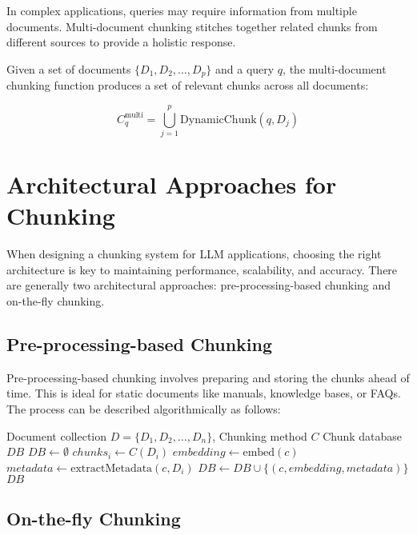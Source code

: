 \documentclass{article}
\begin{document}
In complex applications, queries may require information from multiple documents. Multi-document chunking stitches together related chunks from different sources to provide a holistic response.

Given a set of documents $\{D_1, D_2, \ldots, D_p\}$ and a query $q$, the multi-document chunking function produces a set of relevant chunks across all documents:

\begin{equation}
C_q^{\textrm{multi}} = \bigcup_{j=1}^p \textrm{DynamicChunk}(q, D_j)
\end{equation}

\section{Architectural Approaches for Chunking}

When designing a chunking system for LLM applications, choosing the right architecture is key to maintaining performance, scalability, and accuracy. There are generally two architectural approaches: pre-processing-based chunking and on-the-fly chunking.

\subsection{Pre-processing-based Chunking}

Pre-processing-based chunking involves preparing and storing the chunks ahead of time. This is ideal for static documents like manuals, knowledge bases, or FAQs. The process can be described algorithmically as follows:

\begin{algorithm}
\begin{algorithmic}[1]
\REQUIRE Document collection $D = \{D_1, D_2, \ldots, D_n\}$, Chunking method $C$
\ENSURE Chunk database $DB$
\STATE $DB \gets \emptyset$
    \STATE $chunks_i \gets C(D_i)$
        \STATE $embedding \gets \textrm{embed}(c)$
        \STATE $metadata \gets \textrm{extractMetadata}(c, D_i)$
        \STATE $DB \gets DB \cup \{(c, embedding, metadata)\}$
    \ENDFOR
\ENDFOR
\RETURN $DB$
\end{algorithmic}
\end{algorithm}

\subsection{On-the-fly Chunking}
\end{document}
